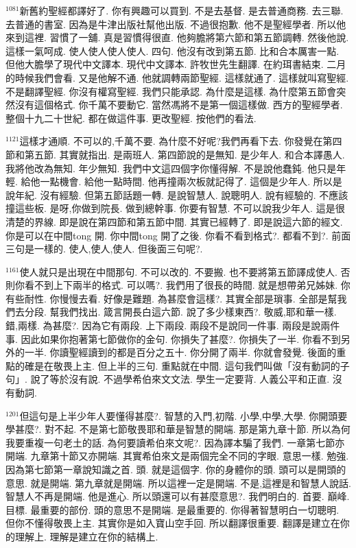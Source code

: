 \documentclass{book}
\begin{document}
$^{1081}$新舊約聖經都譯好了.
你有興趣可以買到.
不是去基督.
是去普通商務.
去三聯.
去普通的書室.
因為是牛津出版社幫他出版.
不過很抱歉.
他不是聖經學者.
所以他來到這裡.
習慣了一舖.
真是習慣得很直.
他夠膽將第六節和第五節調轉.
然後他說.
這樣一氣呵成.
使人使人使人使人.
四句.
他沒有改到第五節.
比和合本厲害一點.
但他大膽學了現代中文譯本.
現代中文譯本.
許牧世先生翻譯.
在約珥書結束.
二月的時候我們會看.
又是他解不通.
他就調轉兩節聖經.
這樣就通了.
這樣就叫寫聖經.
不是翻譯聖經.
你沒有權寫聖經.
我們只能承認.
為什麼是這樣.
為什麼第五節會突然沒有這個格式.
你千萬不要動它.
當然馮將不是第一個這樣做.
西方的聖經學者.
整個十九二十世紀.
都在做這件事.
更改聖經.
按他們的看法.

$^{1121}$這樣才通順.
不可以的,千萬不要.
為什麼不好呢?我們再看下去.
你發覺在第四節和第五節.
其實就指出.
是兩班人.
第四節說的是無知.
是少年人.
和合本譯愚人.
我將他改為無知.
年少無知.
我們中文這四個字你懂得解.
不是說他蠢鈍.
他只是年輕.
給他一點機會.
給他一點時間.
他再撞兩次板就記得了.
這個是少年人.
所以是說年紀.
沒有經驗.
但第五節話題一轉.
是說智慧人.
說聰明人.
說有經驗的.
不應該撞這些板.
是呀,你做到院長.
做到總幹事.
你要有智慧.
不可以說我少年人.
這是很清楚的界線.
即是說在第四節和第五節中間.
其實已經轉了.
即是說這六節的經文.
你是可以在中間tong 開.
你中間tong 開了之後.
你看不看到格式?.
都看不到?.
前面三句是一樣的.
使人,使人,使人.
但後面三句呢?.

$^{1161}$使人就只是出現在中間那句.
不可以改的.
不要搬.
也不要將第五節譯成使人.
否則你看不到上下兩半的格式.
可以嗎?.
我們用了很長的時間.
就是想帶弟兄姊妹.
你有些耐性.
你慢慢去看.
好像是難題.
為甚麼會這樣?.
其實全部是瑣事.
全部是幫我們去分段.
幫我們找出.
箴言開長白這六節.
說了多少樣東西?.
敬威,耶和華一樣.
錯,兩樣.
為甚麼?.
因為它有兩段.
上下兩段.
兩段不是說同一件事.
兩段是說兩件事.
因此如果你抱著第七節做你的金句.
你損失了甚麼?.
你損失了一半.
你看不到另外的一半.
你讀聖經讀到的都是百分之五十.
你分開了兩半.
你就會發覺.
後面的重點的確是在敬畏上主.
但上半的三句.
重點就在中間.
這句我們叫做「沒有動詞的子句」.
說了等於沒有說.
不過學希伯來文文法.
學生一定要背.
人義公平和正直.
沒有動詞.

$^{1201}$但這句是上半少年人要懂得甚麼?.
智慧的入門,初階.
小學,中學,大學.
你開頭要學甚麼?.
對不起.
不是第七節敬畏耶和華是智慧的開端.
那是第九章十節.
所以為何我要重複一句老土的話.
為何要讀希伯來文呢?.
因為譯本騙了我們.
一章第七節亦開端.
九章第十節又亦開端.
其實希伯來文是兩個完全不同的字眼.
意思一樣.
勉強.
因為第七節第一章說知識之首.
頭.
就是這個字.
你的身體你的頭.
頭可以是開頭的意思.
就是開端.
第九章就是開端.
所以這裡一定是開端.
不是,這裡是和智慧人說話.
智慧人不再是開端.
他是進心.
所以頭還可以有甚麼意思?.
我們明白的.
首要.
巔峰.
目標.
最重要的部份.
頭的意思不是開端.
是最重要的.
你得著智慧明白一切聰明.
但你不懂得敬畏上主.
其實你是如入寶山空手回.
所以翻譯很重要.
翻譯是建立在你的理解上.
理解是建立在你的結構上.
\end{document}
